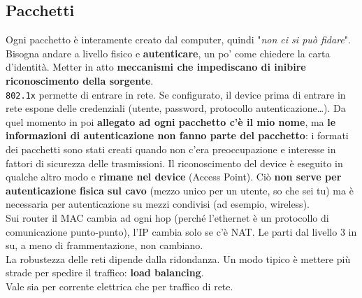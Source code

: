 \documentclass[10pt]{book}
\begin{document}
\subsection{Pacchetti}
Ogni pacchetto è interamente creato dal computer, quindi "\textit{non ci si può fidare}".\\
Bisogna andare a livello fisico e \textbf{autenticare}, un po' come chiedere la carta d'identità. Metter in atto \textbf{meccanismi che impediscano di inibire riconoscimento della sorgente}.\\
\texttt{802.1x} permette di entrare in rete. Se configurato, il device prima di entrare in rete espone delle credenziali (utente, password, protocollo autenticazione\ldots). Da quel momento in poi \textbf{allegato ad ogni pacchetto c'è il mio nome}, ma \textbf{le informazioni di autenticazione non fanno parte del pacchetto}: i formati dei pacchetti sono stati creati quando non c'era preoccupazione e interesse in fattori di sicurezza delle trasmissioni. Il riconoscimento del device è eseguito in qualche altro modo e \textbf{rimane nel device} (Access Point). Ciò \textbf{non serve per autenticazione fisica sul cavo} (mezzo unico per un utente, so che sei tu) ma è necessaria per autenticazione su mezzi condivisi (ad esempio, wireless).\\
Sui router il MAC cambia ad ogni hop (perché l'ethernet è un protocollo di comunicazione punto-punto), l'IP cambia solo se c'è NAT. Le parti dal livello 3 in su, a meno di frammentazione, non cambiano.\\
La robustezza delle reti dipende dalla ridondanza. Un modo tipico è mettere più strade per spedire il traffico: \textbf{load balancing}.\\
Vale sia per corrente elettrica che per traffico di rete.
\pagebreak
\end{document}
